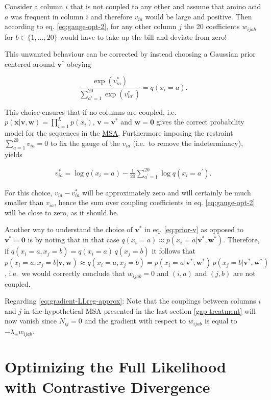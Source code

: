 \documentclass[12pt,a4paper,twoside]{book}
\newcommand{\eq}{\!=\!}
\newcommand{\seq}{\mathbf{x}}
\renewcommand{\v}{\mathbf{v}}
\newcommand{\via}{v_{ia}}
\newcommand{\w}{\mathbf{w}}
\newcommand{\wijab}{w_{ijab}}
\theoremstyle{definition}
\theoremstyle{definition}
\theoremstyle{remark}
\begin{document}
Consider a column \(i\) that is not coupled to any other and assume that
amino acid \(a\) was frequent in column \(i\) and therefore \(\via\)
would be large and positive. Then according to eq. \eqref{eq:gauge-opt-2},
for any other column \(j\) the 20 coefficients \(\wijab\) for
\(b \in \{1,\ldots,20\}\) would have to take up the bill and deviate
from zero!

This unwanted behaviour can be corrected by instead choosing a Gaussian
prior centered around \(\v^*\) obeying

\begin{equation}
  \frac{\exp(\via^*)}{\sum_{a'=1}^{20} \exp(v_{ia'}^*)} = q(x_i=a) .
\end{equation}

This choice ensures that if no columns are coupled, i.e.
\(p(\seq | \v,\w) = \prod_{i=1}^L p(x_i)\), \(\v=\v^*\) and
\(\w= \mathbf{0}\) gives the correct probability model for the sequences
in the \protect\hyperlink{abbrev}{MSA}. Furthermore imposing the
restraint \(\sum_{a=1}^{20} \via \eq 0\) to fix the gauge of the
\(\via\) (i.e.~to remove the indeterminacy), yields

\begin{align}
\via^* = \log q(x_i \eq a) - \frac{1}{20} \sum_{a^{\prime}=1}^{20} \log q(x_i \eq a^{\prime}) .
\label{eq:prior-v}
\end{align}

For this choice, \(\via - \via^*\) will be approximately zero and will
certainly be much smaller than \(\via\), hence the sum over coupling
coefficients in eq. \eqref{eq:gauge-opt-2} will be close to zero, as it
should be.

Another way to understand the choice of \(\v^*\) in eq. \eqref{eq:prior-v}
as opposed to \(\v^*=\mathbf{0}\) is by noting that in that case
\(q(x_i \eq a) \approx p(x_i \eq a|\v^*,\w^*)\). Therefore, if
\(q(x_i \eq a,x_j \eq b) = q(x_i \eq a) \, q(x_j \eq b)\) it follows
that
\(p(x_i \eq a, x_j \eq b | \v,\w) \approx q(x_i \eq a, x_j \eq b) = p(x_i \eq a | \v^*,\w^*)\, p(x_j \eq b | \v^*,\w^*)\),
i.e.~we would correctly conclude that \(\wijab=0\) and \((i,a)\) and
\((j,b)\) are not coupled.

Regarding \eqref{eq:gradient-LLreg-approx}: Note that the couplings
between columns \(i\) and \(j\) in the hypothetical MSA presented in the
last section \ref{gap-treatment} will now vanish since \(N_{ij} \eq 0\)
and the gradient with respect to \(\wijab\) is equal to
\(-\lambda_w \wijab\).

\section{Optimizing the Full Likelihood with Contrastive
Divergence}\label{full-likelihood-gradient}
\end{document}
